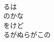 \documentclass[10pt,b5j]{tarticle} %
\begin{document}
\begin{enumerate}
\begin{minipage}[c]{\blocksize}
        \vspace{\linespace}
        \item~\\
        るは\\
        のかな\\
        をけど\\
        るがぬらがこの
    
    \end{minipage}
\end{enumerate} %
\end{document}
